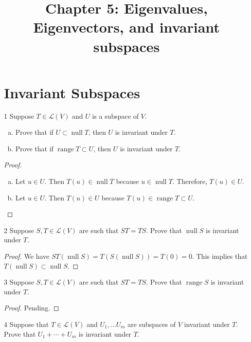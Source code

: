 \documentclass{extarticle}
\title{\vspace{-2em}Chapter 5: Eigenvalues, Eigenvectors, and invariant subspaces}
\newenvironment{problem}[1]{\begin{prob*}{#1}{}}{\end{prob*}}
\DeclareMathOperator{\Null}{null}
\DeclareMathOperator{\Range}{range}
\begin{document}
\maketitle

\newpage
\tableofcontents
\newpage

\section{Invariant Subspaces}

\begin{problem}{1}
Suppose $T \in \mathcal{L}(V)$ and $U$ is a subspace of $V$.
\begin{enumerate}[(a)]
  \item Prove that if $U \subset \Null T$, then $U$ is invariant under $T$.
  \item Prove that if $\Range T \subset U$, then $U$ is invariant under $T$.
\end{enumerate}
\end{problem}
\begin{proof}
  \begin{enumerate}[(a)]
    \item Let $u \in U$. Then $T(u) \in \Null T$ because $u \in \Null T$. Therefore, $T(u) \in U$.
    \item Let $u \in U$. Then $T(u) \in U$ because $T(u) \in \Range T \subset U$.
  \end{enumerate}
\end{proof}

\begin{problem}{2}
Suppose $S,T \in \mathcal{L}(V)$ are such that $ST = TS$. Prove that $\Null S$ is invariant under $T$.
\end{problem}

\begin{proof}
We have $ST(\Null S) = T(S(\Null S)) = T(0) = 0$. This implies that $T(\Null S) \subset \Null S$.
\end{proof}

\begin{problem}{3}
Suppose $S,T \in \mathcal{L}(V)$ are such that $ST = TS$. Prove that $\Range S$ is invariant under $T$.
\end{problem}

\begin{proof}
Pending.
\end{proof}

\begin{problem}{4}
Suppose that $T \in \mathcal{L}(V)$ and $U_1, \ldots U_m$ are subspaces of $V$ invariant under $T$. Prove that $U_1 + \cdots + U_m$ is invariant under $T$.
\end{problem}
\end{document}
